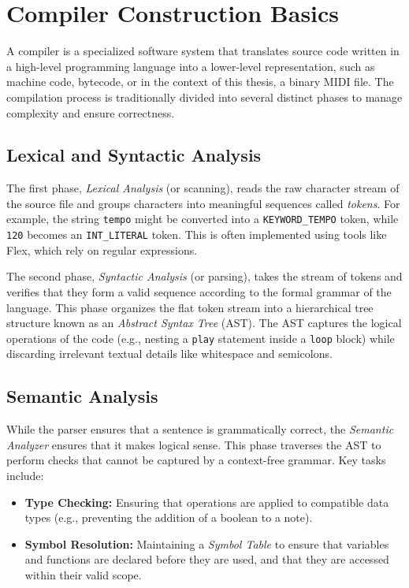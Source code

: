 \section{Compiler Construction Basics}\label{sec:background-compilers}

A compiler is a specialized software system that translates source code written in a high-level programming language
into a lower-level representation, such as machine code, bytecode, or in the context of this thesis, a binary MIDI file.
The compilation process is traditionally divided into several distinct phases to manage complexity and ensure
correctness.

\subsection{Lexical and Syntactic Analysis}\label{subsec:lexical-and-syntactic-analysis}

The first phase, \textit{Lexical Analysis} (or scanning), reads the raw character stream of the source file and groups
characters into meaningful sequences called \textit{tokens}.
For example, the string \texttt{tempo} might be converted into a \texttt{KEYWORD\_TEMPO} token, while \texttt{120}
becomes an \texttt{INT\_LITERAL} token.
This is often implemented using tools like Flex, which rely on regular expressions.

The second phase, \textit{Syntactic Analysis} (or parsing), takes the stream of tokens and verifies that they form a
valid sequence according to the formal grammar of the language.
This phase organizes the flat token stream into a hierarchical tree structure known as an \textit{Abstract Syntax Tree}
(AST).
The AST captures the logical operations of the code (e.g., nesting a \texttt{play} statement inside a \texttt{loop}
block) while discarding irrelevant textual details like whitespace and semicolons.

\subsection{Semantic Analysis}\label{subsec:semantic-analysis}

While the parser ensures that a sentence is grammatically correct, the \textit{Semantic Analyzer} ensures that it makes
logical sense.
This phase traverses the AST to perform checks that cannot be captured by a context-free grammar.
Key tasks include:
\begin{itemize}
  \item \textbf{Type Checking:} Ensuring that operations are applied to compatible data types (e.g., preventing the
    addition of a boolean to a note).
  \item \textbf{Symbol Resolution:} Maintaining a \textit{Symbol Table} to ensure that variables and functions are
    declared before they are used, and that they are accessed within their valid scope.
\end{itemize}

